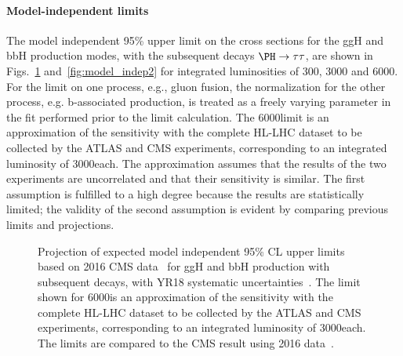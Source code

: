 \paragraph{Model-independent limits}
\label{sec:model_indep}
%
The model independent 
95\% \CL upper
limit on the cross sections for the ggH and bbH 
production modes, 
with the subsequent decays $\PH\to\tau\tau$,
are shown in Figs.~\ref{fig:model_indep} and~\ref{fig:model_indep2} for 
integrated luminosities of 300, 3000 and 6000\fbinv. 
For the limit on one process, e.g., gluon fusion, the normalization for the other process, e.g. b-associated production, is treated as a freely varying parameter in the fit performed prior to the limit calculation.
The 6000\fbinv limit is an approximation of the sensitivity with the complete HL-LHC 
dataset to be collected by the ATLAS and CMS experiments, corresponding to an integrated 
luminosity of 3000\fbinv each. The approximation assumes that the results of the 
two experiments are uncorrelated and that their sensitivity is similar. The first 
assumption is fulfilled to a high degree because the results are statistically limited; 
the validity of the second assumption is evident by comparing previous limits and 
projections. 
%
\begin{figure}[htbp]
\begin{center}
\end{center}
\caption{Projection of expected model independent
  95\% CL upper limits based on 2016 CMS data~\cite{HIG-17-020} for 
ggH and bbH production with subsequent \htt decays, with YR18 systematic 
uncertainties~\cite{CMS-PAS-FTR-18-017}. 
The limit shown for 6000\fbinv is an approximation of the 
sensitivity with the complete HL-LHC dataset to be collected by the ATLAS and 
CMS experiments, corresponding to an integrated luminosity of 3000\fbinv each.
The limits are compared to the CMS result using 2016 data~\cite{HIG-17-020}.}
\label{fig:model_indep}
\end{figure}

